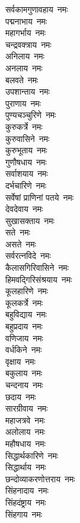 \begin{multicols}{2}
\begin{flushleft}
सर्वकामगुणावहाय~नमः\\
पद्मनाभाय~नमः\\
महागर्भाय~नमः\\
चन्द्रवक्त्राय~नमः\hfill{}\\
अनिलाय~नमः\\
अनलाय~नमः\\
बलवते~नमः\\
उपशान्ताय~नमः\\
पुराणाय~नमः\\
पुण्यचञ्चुरिणे~नमः\\
कुरुकर्त्रे~नमः\\
कुरुवासिने~नमः\\
कुरुभूताय~नमः\\
गुणौषधाय~नमः\hfill{}\\
सर्वाशयाय~नमः\\
दर्भचारिणे~नमः\\
सर्वेषां प्राणिनां पतये~नमः\\
देवदेवाय~नमः\\
सुखासक्ताय~नमः\\
सते~नमः\\
असते~नमः\\
सर्वरत्नविदे~नमः\\
कैलासगिरिवासिने~नमः\\
हिमवद्गिरिसंश्रयाय~नमः\hfill{}\\
कूलहारिणे~नमः\\
कूलकर्त्रे~नमः\\
बहुविद्याय~नमः\\
बहुप्रदाय~नमः\\
वणिजाय~नमः\\
वर्धकिने~नमः\\
वृक्षाय~नमः\\
बकुलाय~नमः\\
चन्दनाय~नमः\\
छदाय~नमः\hfill{}\\
सारग्रीवाय~नमः\\
महाजत्रवे~नमः\\
अलोलाय~नमः\\
महौषधाय~नमः\\
सिद्धार्थकारिणे~नमः\\
सिद्धार्थाय~नमः\\
छन्दोव्याकरणोत्तराय~नमः\\
सिंहनादाय~नमः\\
सिंहदंष्ट्राय~नमः\\
सिंहगाय~नमः\hfill{}\\

\end{flushleft}
\end{multicols}

